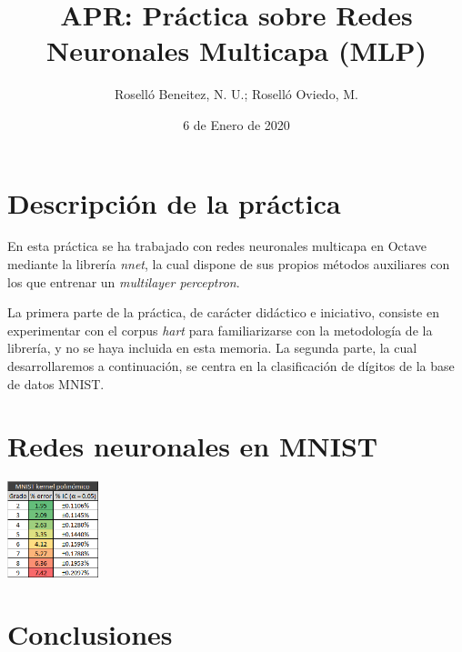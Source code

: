 \documentclass[a4paper]{article}
\begin{document}
\author{Roselló Beneitez, N. U.; Roselló Oviedo, M.}
\title{APR: Práctica sobre Redes Neuronales Multicapa (MLP)}
\date{6 de Enero de 2020}
\maketitle{}
\thispagestyle{empty}

\newpage
\tableofcontents
\listoffigures

\newpage
\section{Descripción de la práctica}
\quad En esta práctica se ha trabajado con redes neuronales multicapa en Octave mediante la librería \textit{nnet}, la cual dispone de sus propios métodos auxiliares con los que entrenar un \textit{multilayer perceptron}.

\quad La primera parte de la práctica, de carácter didáctico e iniciativo, consiste en experimentar con el corpus \textit{hart} para familiarizarse con la metodología de la librería, y no se haya incluida en esta memoria. La segunda parte, la cual desarrollaremos a continuación, se centra en la clasificación de dígitos de la base de datos MNIST.

\section{Redes neuronales en MNIST}
\quad 

\begin{center}
\includegraphics[width=100px]{2_mnist}
\end{center}

\section{Conclusiones}
\quad 
\end{document}
